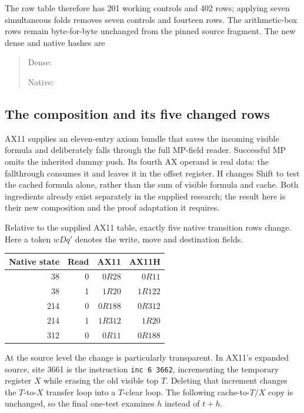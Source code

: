 \documentclass[11pt,a4paper]{article}
\begin{document}
The raw table therefore has 201 working controls and 402 rows; applying
seven simultaneous folds removes seven controls and fourteen rows.
The arithmetic-box rows remain byte-for-byte unchanged from the pinned
source fragment. The new dense and native hashes are
\begin{quote}\small
Dense: \par
Native: 
\end{quote}

\subsection{The composition and its five changed rows}

AX11 supplies an eleven-entry axiom bundle that saves the incoming visible
formula and deliberately falls through the full MP-field reader. Successful
MP omits the inherited dummy push. Its fourth AX operand is real data:
the fallthrough consumes it and leaves it in the offset register. H changes
Shift to test the cached formula alone, rather than the sum of visible
formula and cache. Both ingredients already exist separately in the
supplied research; the result here is their new composition and the proof
adaptation it requires.\cite{ax11packet}

Relative to the supplied AX11 table, exactly five native transition rows
change. Here a token $wDq'$ denotes the write, move and destination fields.

\begin{center}
\begin{tabular}{rrrr}
\toprule
Native state & Read & AX11 & AX11H\\
\midrule
38 & 0 & $0R28$ & $0R11$\\
38 & 1 & $1R20$ & $1R122$\\
214 & 0 & $0R188$ & $0R312$\\
214 & 1 & $1R312$ & $1R20$\\
312 & 0 & $0R11$ & $0R188$\\
\bottomrule
\end{tabular}
\end{center}

At the source level the change is particularly transparent. In AX11's
expanded source, site 3661 is the instruction
\texttt{inc 6 3662}, incrementing the temporary register $X$ while erasing
the old visible top $T$. Deleting that increment changes the $T$-to-$X$
transfer loop into a $T$-clear loop. The following cache-to-$T/X$ copy is
unchanged, so the final one-test examines $h$ instead of $t+h$.
\end{document}
